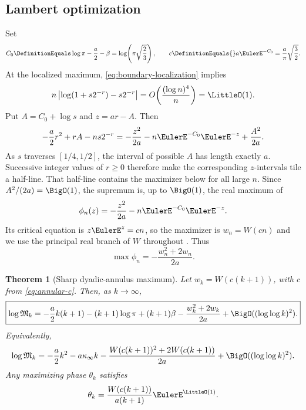 \documentclass[11pt,oneside]{article}
\numberwithin{equation}{section}
\newtheorem{theorem}{Theorem}[section]
\theoremstyle{definition}
\theoremstyle{remark}
\begin{document}
\subsection{Lambert optimization}

Set
\begin{equation}
 C_0\DefinitionEquals\log\pi-\frac a2-\beta=\log\!\left(\pi\sqrt{\frac23}\right),
 \qquad
 c\DefinitionEquals{}a\EulerE^{-C_0}=\frac a\pi\sqrt{\frac32}.
 \label{eq:annular-c}
\end{equation}
At the localized maximum, \eqref{eq:boundary-localization} implies
\[
 n\left|\log(1+s2^{-r})-s2^{-r}\right|
 =O\!\left(\frac{(\log n)^4}{n}\right)=\LittleO(1).
\]
Put $A=C_0+\log s$ and $z=ar-A$.  Then
\begin{equation}
 -\frac a2r^2+rA-ns2^{-r}
 =-\frac{z^2}{2a}-n\EulerE^{-C_0}\EulerE^{-z}+\frac{A^2}{2a}.
 \label{eq:z-objective}
\end{equation}
As $s$ traverses $[1/4,1/2]$, the interval of possible $A$ has length exactly $a$.
Successive integer values of $r\ge0$ therefore make the corresponding $z$-intervals tile a
half-line.  That half-line contains the maximizer below for all large $n$.  Since
$A^2/(2a)=\BigO(1)$, the supremum is, up to $\BigO(1)$, the real maximum of
\[
 \phi_n(z)=-\frac{z^2}{2a}-n\EulerE^{-C_0}\EulerE^{-z}.
\]
Its critical equation is $z\EulerE^z=cn$, so the maximizer is $w_n=W(cn)$ and
we use the principal real branch of $W$ throughout \cite{corless-lambert}.  Thus
\begin{equation}
 \max\phi_n=-\frac{w_n^2+2w_n}{2a}.
 \label{eq:Lambert-value}
\end{equation}

\begin{theorem}[Sharp dyadic-annulus maximum]
\label{thm:annular-main}
Let $w_k=W(c(k+1))$, with $c$ from \eqref{eq:annular-c}.  Then, as $k\to\infty$,
\begin{equation}
 \boxed{\displaystyle
 \log\mathfrak M_k
 =-\frac a2k(k+1)-(k+1)\log\pi+(k+1)\beta
 -\frac{w_k^2+2w_k}{2a}
 +\BigO((\log\log k)^2).}
 \label{eq:annular-main}
\end{equation}
Equivalently,
\begin{equation}
 \log\mathfrak M_k
 =-\frac a2k^2-a\kappa_\infty k
 -\frac{W(c(k+1))^2+2W(c(k+1))}{2a}
 +\BigO((\log\log k)^2).
 \label{eq:annular-main-compact}
\end{equation}
Any maximizing phase $\theta_k$ satisfies
\begin{equation}
 \theta_k=\frac{W(c(k+1))}{a(k+1)}\EulerE^{\LittleO(1)}.
 \label{eq:annular-location}
\end{equation}
\end{theorem}
\end{document}
